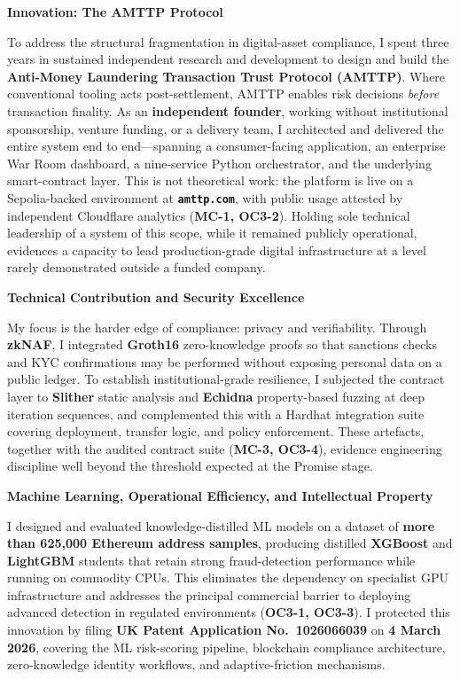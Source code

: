 \documentclass[12pt,a4paper]{article}
\begin{document}
\textbf{Innovation: The AMTTP Protocol}

To address the structural fragmentation in digital-asset compliance, I spent three years in sustained independent research and development to design and build the \textbf{Anti-Money Laundering Transaction Trust Protocol (AMTTP)}. Where conventional tooling acts post-settlement, AMTTP enables risk decisions \emph{before} transaction finality. As an \textbf{independent founder}, working without institutional sponsorship, venture funding, or a delivery team, I architected and delivered the entire system end to end---spanning a consumer-facing application, an enterprise War Room dashboard, a nine-service Python orchestrator, and the underlying smart-contract layer. This is not theoretical work: the platform is live on a Sepolia-backed environment at \textbf{\texttt{amttp.com}}, with public usage attested by independent Cloudflare analytics (\textbf{MC-1, OC3-2}). Holding sole technical leadership of a system of this scope, while it remained publicly operational, evidences a capacity to lead production-grade digital infrastructure at a level rarely demonstrated outside a funded company.

\textbf{Technical Contribution and Security Excellence}

My focus is the harder edge of compliance: privacy and verifiability. Through \textbf{zkNAF}, I integrated \textbf{Groth16} zero-knowledge proofs so that sanctions checks and KYC confirmations may be performed without exposing personal data on a public ledger. To establish institutional-grade resilience, I subjected the contract layer to \textbf{Slither} static analysis and \textbf{Echidna} property-based fuzzing at deep iteration sequences, and complemented this with a Hardhat integration suite covering deployment, transfer logic, and policy enforcement. These artefacts, together with the audited contract suite (\textbf{MC-3, OC3-4}), evidence engineering discipline well beyond the threshold expected at the Promise stage.

\textbf{Machine Learning, Operational Efficiency, and Intellectual Property}

I designed and evaluated knowledge-distilled ML models on a dataset of \textbf{more than 625{,}000 Ethereum address samples}, producing distilled \textbf{XGBoost} and \textbf{LightGBM} students that retain strong fraud-detection performance while running on commodity CPUs. This eliminates the dependency on specialist GPU infrastructure and addresses the principal commercial barrier to deploying advanced detection in regulated environments (\textbf{OC3-1, OC3-3}). I protected this innovation by filing \textbf{UK Patent Application No.\ 1026066039} on \textbf{4 March 2026}, covering the ML risk-scoring pipeline, blockchain compliance architecture, zero-knowledge identity workflows, and adaptive-friction mechanisms.
\end{document}
